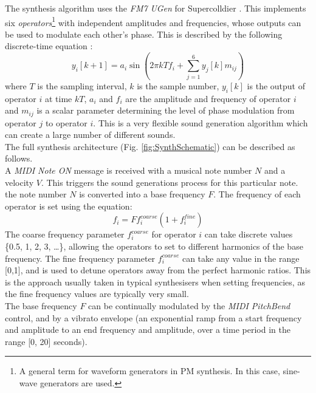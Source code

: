 \documentclass[11pt, oneside]{report}   	%
\begin{document}
The synthesis algorithm uses the \emph{FM7 UGen} for Supercolldier \cite{UGen}. This implements six \emph{operators}\footnote{A general term for waveform generators in PM synthesis. In this case, sine-wave generators are used.} with independent amplitudes and frequencies, whose outputs can be used to modulate each other's phase. This is described by the following discrete-time equation \cite{YeeKing}: 
\begin{equation}
y_i[k+1] = a_i\sin\left(2\pi kT f_i + \sum_{j = 1}^{6} y_j[k] m_{ij}\right)
\end{equation}
where $T$ is the sampling interval, $k$ is the sample number, $y_i[k]$ is the output of operator $i$ at time $kT$, $a_i$ and $f_i$ are the amplitude and frequency of operator $i$ and $m_{ij}$ is a scalar parameter determining the level of phase modulation from operator $j$ to operator $i$. This is a very flexible sound generation algorithm which can create a large number of different sounds. \\
The full synthesis architecture (Fig. \ref{fig:SynthSchematic}) can be described as follows.\\
 A \emph{MIDI Note ON} message is received with a musical note number $N$ and a velocity $V$. This triggers the sound generations process for this particular note. the note number $N$ is converted into a base frequency $F$. The frequency of each operator is set using the equation: 
 \begin{equation}
	f_i = Ff_i^{coarse}(1+f_i^{fine})
 \end{equation}
The coarse frequency parameter $f_i^{coarse}$ for operator $i$ can take discrete values \{0.5, 1, 2, 3, \dots\}, allowing the operators to set to different harmonics of the base frequency. The fine frequency parameter $f_i^{coarse}$ can take any value in the range [0,1], and is used to detune operators away from the perfect harmonic ratios. This is the approach usually taken in typical synthesisers when setting frequencies, as the fine frequency values are typically very small.\\
The base frequency $F$ can be continually modulated by the \emph{MIDI PitchBend} control, and by a vibrato envelope (an exponential ramp from a start frequency and amplitude to an end frequency and amplitude, over a time period in the range [0, 20] seconds).
\end{document}
